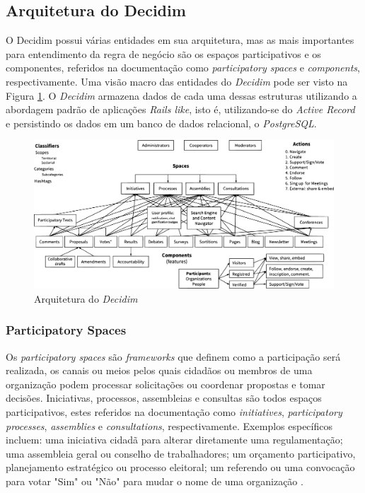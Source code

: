 \subsection{Arquitetura do Decidim}

O Decidim possui várias entidades em sua arquitetura, mas as mais importantes para entendimento da regra de negócio são os espaços participativos e os componentes, referidos na documentação como \textit{participatory spaces} e \textit{components}, respectivamente. Uma visão macro das entidades do \textit{Decidim} pode ser visto na Figura \ref{fig:arquitetura-decidim}. O \textit{Decidim} armazena dados de cada uma dessas estruturas utilizando a abordagem padrão de aplicações \textit{Rails like}, isto é, utilizando-se do \textit{Active Record} e persistindo os dados em um banco de dados relacional, o \textit{PostgreSQL}.

\begin{figure}[htbp]
  \centering
  \caption{Arquitetura do \textit{Decidim}}
  \label{fig:arquitetura-decidim}
  \includegraphics[width=\textwidth]{figuras/diagrama_decidim-min.eps}
\end{figure}

\subsubsection{Participatory Spaces}

Os \textit{participatory spaces} são \textit{frameworks} que definem como a participação será realizada, os canais ou meios pelos quais cidadãos ou membros de uma organização podem processar solicitações ou coordenar propostas e tomar decisões. Iniciativas, processos, assembleias e consultas são todos espaços participativos, estes referidos na documentação como \textit{initiatives}, \textit{participatory processes}, \textit{assemblies} e \textit{consultations}, respectivamente. Exemplos específicos incluem: uma iniciativa cidadã para alterar diretamente uma regulamentação; uma assembleia geral ou conselho de trabalhadores; um orçamento participativo, planejamento estratégico ou processo eleitoral; um referendo ou uma convocação para votar "Sim" ou "Não" para mudar o nome de uma organização \cite{decidim-descriptionpage}.

